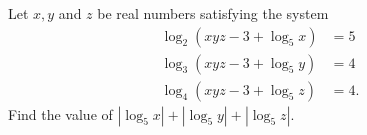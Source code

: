 Let $x,y$ and $z$ be real numbers satisfying the system \begin{align*}

\log_2(xyz-3+\log_5 x) &= 5 \\

\log_3(xyz-3+\log_5 y) &= 4 \\

\log_4(xyz-3+\log_5 z) &= 4.

\end{align*}Find the value of $|\log_5 x|+|\log_5 y|+|\log_5 z|$.